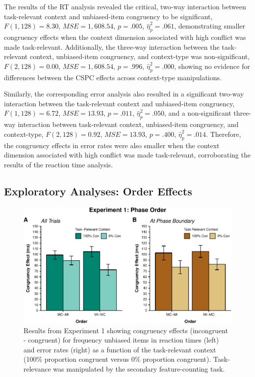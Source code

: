 \documentclass[english,,man,floatsintext]{apa6}
\begin{document}
The results of the RT analysis revealed the critical, two-way interaction between task-relevant context and unbiased-item congruency to be significant, \(F(1, 128) = 8.30\), \(\mathit{MSE} = 1,608.54\), \(p = .005\), \(\hat{\eta}^2_p = .061\), demonstrating smaller congruency effects when the context dimension associated with high conflict was made task-relevant. Additionally, the three-way interaction between the task-relevant context, unbiased-item congruency, and context-type was non-significant, \(F(2, 128) = 0.00\), \(\mathit{MSE} = 1,608.54\), \(p = .996\), \(\hat{\eta}^2_p = .000\), showing no evidence for differences between the CSPC effects across context-type manipulations.

Similarly, the corresponding error analysis also resulted in a significant two-way interaction between the task-relevant context and unbiased-item congruency, \(F(1, 128) = 6.72\), \(\mathit{MSE} = 13.93\), \(p = .011\), \(\hat{\eta}^2_p = .050\), and a non-significant three-way interaction between task-relevant context, unbiased-item congruency, and context-type, \(F(2, 128) = 0.92\), \(\mathit{MSE} = 13.93\), \(p = .400\), \(\hat{\eta}^2_p = .014\). Therefore, the congruency effects in error rates were also smaller when the context dimension associated with high conflict was made task-relevant, corroborating the results of the reaction time analysis.

\hypertarget{exploratory-analyses-order-effects}{%
\subsection{Exploratory Analyses: Order Effects}\label{exploratory-analyses-order-effects}}

\begin{figure}
\centering
\includegraphics{manuscript_pretty_files/figure-latex/figure2b-1.pdf}
\caption{\label{fig:figure2b}Results from Experiment 1 showing congruency effects (incongruent - congruent) for frequency unbiased items in reaction times (left) and error rates (right) as a function of the task-relevant context (100\% proportion congruent versus 0\% proportion congruent). Task-relevance was manipulated by the secondary feature-counting task.}
\end{figure}
\end{document}
